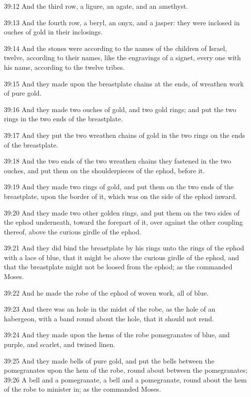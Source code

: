 39:12 And the third row, a ligure, an agate, and an amethyst.

39:13 And the fourth row, a beryl, an onyx, and a jasper: they were
inclosed in ouches of gold in their inclosings.

39:14 And the stones were according to the names of the children of
Israel, twelve, according to their names, like the engravings of a
signet, every one with his name, according to the twelve tribes.

39:15 And they made upon the breastplate chains at the ends, of
wreathen work of pure gold.

39:16 And they made two ouches of gold, and two gold rings; and put
the two rings in the two ends of the breastplate.

39:17 And they put the two wreathen chains of gold in the two rings on
the ends of the breastplate.

39:18 And the two ends of the two wreathen chains they fastened in the
two ouches, and put them on the shoulderpieces of the ephod, before
it.

39:19 And they made two rings of gold, and put them on the two ends of
the breastplate, upon the border of it, which was on the side of the
ephod inward.

39:20 And they made two other golden rings, and put them on the two
sides of the ephod underneath, toward the forepart of it, over against
the other coupling thereof, above the curious girdle of the ephod.

39:21 And they did bind the breastplate by his rings unto the rings of
the ephod with a lace of blue, that it might be above the curious
girdle of the ephod, and that the breastplate might not be loosed from
the ephod; as the \LORD commanded Moses.

39:22 And he made the robe of the ephod of woven work, all of blue.

39:23 And there was an hole in the midst of the robe, as the hole of
an habergeon, with a band round about the hole, that it should not
rend.

39:24 And they made upon the hems of the robe pomegranates of blue,
and purple, and scarlet, and twined linen.

39:25 And they made bells of pure gold, and put the bells between the
pomegranates upon the hem of the robe, round about between the
pomegranates; 39:26 A bell and a pomegranate, a bell and a
pomegranate, round about the hem of the robe to minister in; as the
\LORD commanded Moses.


